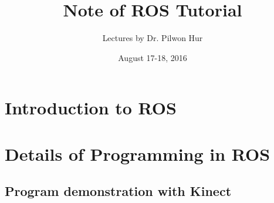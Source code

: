 \documentclass{article}
\title{Note of ROS Tutorial}
\author{Lectures by Dr. Pilwon Hur}
\date{August 17-18, 2016}
\begin{document}
\maketitle
\section{Introduction to ROS}









\section{Details of Programming in ROS}






\subsection{Program demonstration with Kinect}






%
\end{document}
